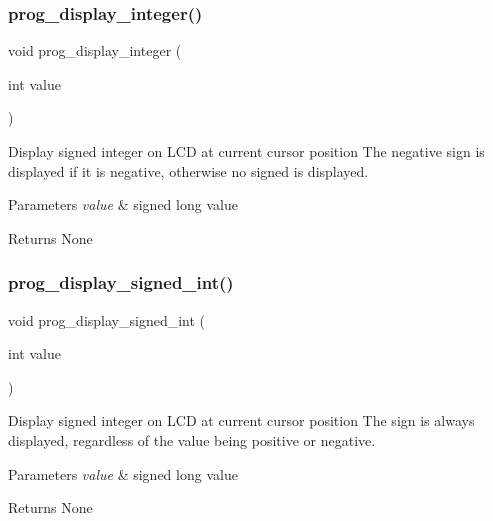\subsubsection{\texorpdfstring{prog\+\_\+display\+\_\+integer()}{prog\_display\_integer()}}
{\footnotesize\ttfamily void prog\+\_\+display\+\_\+integer (\begin{DoxyParamCaption}\item[{int}]{value }\end{DoxyParamCaption})}

Display signed integer on L\+CD at current cursor position The negative sign is displayed if it is negative, otherwise no signed is displayed. 
\begin{DoxyParams}{Parameters}
{\em value} & signed long value \\
\hline
\end{DoxyParams}
\begin{DoxyReturn}{Returns}
None 
\end{DoxyReturn}
\mbox{\label{group__scaffolding_gae0f19e55443d5e98d104d9bc8a0e96a9}} 
\subsubsection{\texorpdfstring{prog\+\_\+display\+\_\+signed\+\_\+int()}{prog\_display\_signed\_int()}}
{\footnotesize\ttfamily void prog\+\_\+display\+\_\+signed\+\_\+int (\begin{DoxyParamCaption}\item[{int}]{value }\end{DoxyParamCaption})}

Display signed integer on L\+CD at current cursor position The sign is always displayed, regardless of the value being positive or negative. 
\begin{DoxyParams}{Parameters}
{\em value} & signed long value \\
\hline
\end{DoxyParams}
\begin{DoxyReturn}{Returns}
None 
\end{DoxyReturn}
\mbox{\label{group__scaffolding_ga59bf0af8d61ca90c1825e3224b45eaf9}} 
